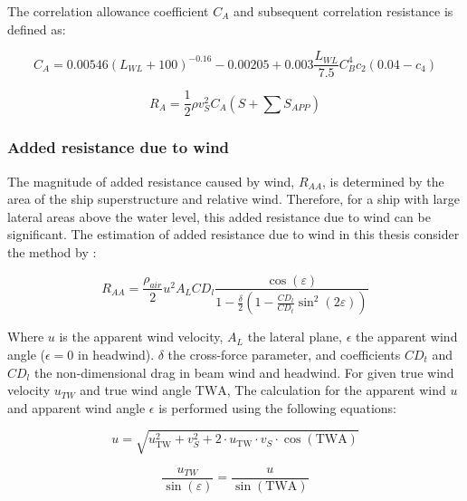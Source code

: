 The correlation allowance coefficient $C_A$ and subsequent correlation resistance is defined as:

\begin{equation}
    \label{eqn:Ca_correlation}
    C_A = 0.00546(L_{WL}+100)^{-0.16} - 0.00205 + 0.003\frac{L_{WL}}{7.5}C_{B}^4c_2(0.04-c_4)
\end{equation}

\begin{equation}
    \label{eqn:R_a}
    R_A = \frac{1}{2}\rho v_S^2 C_A (S+\sum S_{APP})
\end{equation}

\subsubsection{Added resistance due to wind}\label{sec:wind_resistance}

The magnitude of added resistance caused by wind, $R_{AA}$, is determined by the area of the ship superstructure and relative wind. Therefore, for a ship with large lateral areas above the water level, this added resistance due to wind can be significant. The estimation of added resistance due to wind in this thesis consider the method by :

\begin{equation}
    \label{eqn:Raa_blendermann}
    R_{AA} = \frac{\rho_{air}}{2}u^2A_{L}CD_l \frac{\cos{(\varepsilon)}}{1-\frac{\delta}{2}(1-\frac{CD_l}{CD_t}\sin^2{(2\varepsilon)})}
\end{equation}

Where $u$ is the apparent wind velocity, $A_L$ the lateral plane, $\epsilon$ the apparent wind angle ($\epsilon = 0$ in headwind). $\delta$ the cross-force parameter, and coefficients $CD_t$ and $CD_l$ the non-dimensional drag in beam wind and headwind. For given true wind velocity $u_{TW}$ and true wind angle $\text{TWA}$, The calculation for the apparent wind $u$ and apparent wind angle $\epsilon$ is performed using the following equations:

\begin{equation}
    \label{eqn:u_AW}
    u = \sqrt{u_{\text{TW}}^2 + v_S^2 + 2 \cdot u_{\text{TW}} \cdot v_S \cdot \cos(\text{TWA})}
\end{equation}

\begin{equation}
    \label{eqn:epsilon_AWA}
    \frac{u_{TW}}{\sin(\varepsilon)} = \frac{u}{\sin({\text{TWA}})}
\end{equation}

